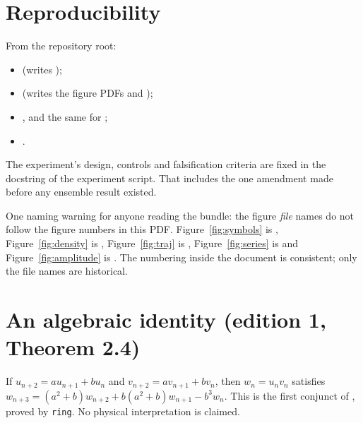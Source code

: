 \documentclass[11pt,a4paper]{article}
\theoremstyle{definition}
\newcommand{\lean}[1]{\path{#1}}
\begin{document}
\section*{Reproducibility}
From the repository root:
\begin{itemize}
  \item {} (writes );
  \item {} (writes the figure PDFs and );
  \item {}, and the same for ;
  \item {}.
\end{itemize}
The experiment's design, controls and falsification criteria are fixed in the docstring of the experiment script. That includes the one amendment made before any ensemble result existed.

One naming warning for anyone reading the bundle: the figure \emph{file} names do not follow the figure numbers in this PDF. Figure~\ref{fig:symbols} is , Figure~\ref{fig:density} is , Figure~\ref{fig:traj} is , Figure~\ref{fig:series} is  and Figure~\ref{fig:amplitude} is . The numbering inside the document is consistent; only the file names are historical.

\appendix
\section{An algebraic identity (edition 1, Theorem 2.4)}
\label{app:sym2}
If $u_{n+2}=au_{n+1}+bu_n$ and $v_{n+2}=av_{n+1}+bv_n$, then $w_n=u_nv_n$ satisfies $w_{n+3}=(a^2+b)w_{n+2}+b(a^2+b)w_{n+1}-b^3w_n$. This is the first conjunct of \lean{P2_T4}, proved by \texttt{ring}. No physical interpretation is claimed.
\end{document}
